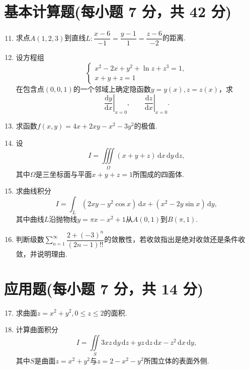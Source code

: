 \documentclass[../Main.tex]{subfiles}
\begin{document}
\section{基本计算题(每小题 7 分，共 42 分)}
\begin{enumerate}
    \setcounter{enumi}{10}
    \item 求点$A(1,2,3)$到直线$L:\dfrac{x-6}{-1}=\dfrac{y-1}{1}=\dfrac{z-6}{-2}$的距离.
          \vspace{11em}

    \item 设方程组
          \[
              \begin{cases}
                  x^{2}-2x+y^{2}+\ln z+z^{3}=1, \\
                  x+y+z=1
              \end{cases}
          \]
          在包含点$(0,0,1)$的一个邻域上确定隐函数$y=y(x),z=z(x)$，求
          \[
              \left.\frac{\mathrm{d}y}{\mathrm{d}x}\right|_{x=0},\qquad \left.\frac{\mathrm{d}z}{\mathrm{d}x}\right|_{x=0}.
          \]
          \vspace{12em}

    \item 求函数$f(x,y)=4x+2xy-x^{2}-3y^{2}$的极值.
          \vspace{11em}

    \item 设
          \[
              I=\iiint\limits_{\Omega}(x+y+z)\,\mathrm{d}x\,\mathrm{d}y\,\mathrm{d}z,
          \]
          其中$\Omega$是三坐标面与平面$x+y+z=1$所围成的四面体.
          \vspace{11em}

    \item 求曲线积分
          \[
              I=\int_{L}(2xy-y^{2}\cos x)\,\mathrm{d}x+(x^{2}-2y\sin x)\,\mathrm{d}y,
          \]
          其中曲线$L$沿抛物线$y=\pi x-x^{2}+1$从$A(0,1)$到$B(\pi,1)$.
          \vspace{12em}

    \item 判断级数$\displaystyle\sum_{n=1}^{\infty}\dfrac{2+(-3)^{n}}{(2n-1)!!}$的敛散性，若收敛指出是绝对收敛还是条件收敛，并说明理由.
          \vspace{12em}
\end{enumerate}

\section{应用题(每小题 7 分，共 14 分)}
\begin{enumerate}
    \setcounter{enumi}{16}
    \item 求曲面$z=x^{2}+y^{2},0\leq z\leq2$的面积.
          \vspace{11em}

    \item 计算曲面积分
          \[
              I=\iint\limits_{S}3xz\,\mathrm{d}y\,\mathrm{d}z+yz\,\mathrm{d}z\,\mathrm{d}x-z^{2}\,\mathrm{d}x\,\mathrm{d}y,
          \]
          其中$S$是曲面$z=x^{2}+y^{2}$与$z=2-x^{2}-y^{2}$所围立体的表面外侧.
          \vspace{12em}
\end{enumerate}
\end{document}
